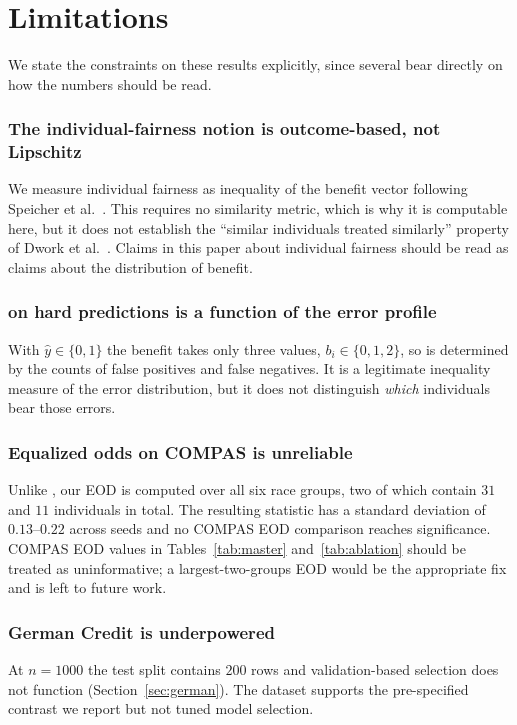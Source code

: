 \section{Limitations}
\label{sec:limitations}

We state the constraints on these results explicitly, since several bear
directly on how the numbers should be read.

\subsubsection{The individual-fairness notion is outcome-based, not Lipschitz}
We measure individual fairness as inequality of the benefit vector following
Speicher et al.~\cite{speicher2018unified}. This requires no similarity metric,
which is why it is computable here, but it does not establish the
``similar individuals treated similarly'' property of
Dwork et al.~\cite{dwork2012fairness}. Claims in this paper about individual
fairness should be read as claims about the distribution of benefit.

\subsubsection{\getwo{} on hard predictions is a function of the error profile}
With $\hat{y} \in \{0,1\}$ the benefit takes only three values,
$b_i \in \{0,1,2\}$, so \getwo{} is determined by the counts of false
positives and false negatives. It is a legitimate inequality measure of the
error distribution, but it does not distinguish \emph{which} individuals bear
those errors.

\subsubsection{Equalized odds on COMPAS is unreliable}
Unlike \dpdtwo{}, our EOD is computed over all six race groups, two of which
contain $31$ and $11$ individuals in total. The resulting statistic has a
standard deviation of $0.13$--$0.22$ across seeds and no COMPAS EOD comparison
reaches significance. COMPAS EOD values in Tables~\ref{tab:master}
and~\ref{tab:ablation} should be treated as uninformative; a largest-two-groups
EOD would be the appropriate fix and is left to future work.

\subsubsection{German Credit is underpowered}
At $n=1000$ the test split contains $200$ rows and validation-based selection
does not function (Section~\ref{sec:german}). The dataset supports the
pre-specified contrast we report but not tuned model selection.

